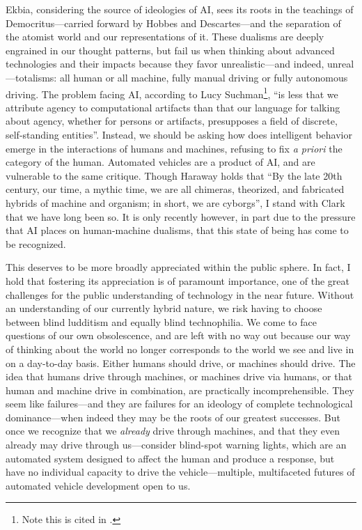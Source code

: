 Ekbia, considering the source of ideologies of AI, sees its roots in
the teachings of Democritus---carried forward by Hobbes
and Descartes---and the separation of the atomist world and our
representations of it.\cite[p. ???]{ekbia} These dualisms are deeply engrained in our
thought patterns, but fail us when thinking about advanced
technologies and their impacts because they favor unrealistic---and
indeed, unreal---totalisms: all human or all machine, fully manual driving or fully
autonomous driving. 
The problem facing AI, according to Lucy Suchman\footnote{Note this is cited in
  \cite[p. 331-332]{ekbia}.}, ``is less that we attribute agency to
computational artifacts than that our language for talking about
agency, whether for persons or artifacts, presupposes a field of
discrete, self-standing entities''\cite[p.
  263]{???-suchman-humanmachinereconfigurations-plansandsituatedactions-2e}.
Instead, we should be asking how does intelligent behavior emerge in the interactions of
humans and machines, refusing to fix \emph{a priori} the category of
the human. Automated vehicles are a product of AI, and are vulnerable
to the same critique. Though Haraway holds that ``By the late 20th
century, our time, a mythic time, we are all chimeras,
theorized, and fabricated hybrids of machine and organism; in short,
we are cyborgs''\cite[p. 118]{???-haraway}, I stand with Clark that we
have long been so. It is only recently however, in part due to the pressure
that AI places on human-machine dualisms, that this state of being has
come to be recognized.

This deserves to be more broadly appreciated within the public sphere.
In fact, I hold that fostering its appreciation is of paramount
importance, one of the great challenges for the public understanding
of technology in the near future. Without an understanding of our
currently hybrid nature, we risk having to choose between blind ludditism
and equally blind technophilia. We come to face questions of our own
obsolescence, and are left with no way out because our way of thinking
about the world no longer corresponds to the world we see and live in
on a day-to-day basis. Either humans should drive, or machines should
drive. The idea that humans drive through machines, or machines drive
via humans, or that human and machine drive in combination, are
practically incomprehensible. They seem like failures---and they are
failures for an ideology of complete technological dominance---when
indeed they may be the roots of our greatest successes. But once we
recognize that we \emph{already} drive through machines, and that they
even already may drive through us---consider blind-spot
warning lights, which are an automated system designed to affect the
human and produce a response, but have no individual capacity to drive
the vehicle---multiple, multifaceted futures of automated vehicle
development open to us.

